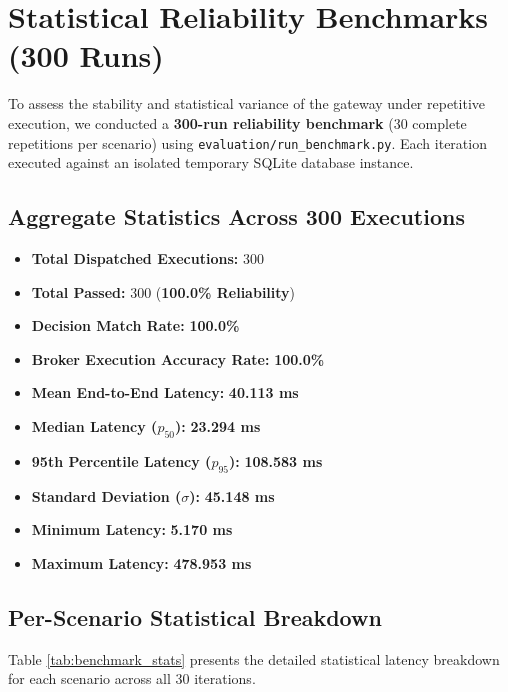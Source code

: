 \section{Statistical Reliability Benchmarks (300 Runs)}
To assess the stability and statistical variance of the gateway under repetitive execution, we conducted a \textbf{300-run reliability benchmark} (30 complete repetitions per scenario) using \texttt{evaluation/run\_benchmark.py}. Each iteration executed against an isolated temporary SQLite database instance.

\subsection{Aggregate Statistics Across 300 Executions}
\begin{itemize}
    \item \textbf{Total Dispatched Executions:} 300
    \item \textbf{Total Passed:} 300 (\textbf{100.0\% Reliability})
    \item \textbf{Decision Match Rate:} \textbf{100.0\%}
    \item \textbf{Broker Execution Accuracy Rate:} \textbf{100.0\%}
    \item \textbf{Mean End-to-End Latency:} \textbf{40.113 ms}
    \item \textbf{Median Latency ($p_{50}$):} \textbf{23.294 ms}
    \item \textbf{95th Percentile Latency ($p_{95}$):} \textbf{108.583 ms}
    \item \textbf{Standard Deviation ($\sigma$):} \textbf{45.148 ms}
    \item \textbf{Minimum Latency:} \textbf{5.170 ms}
    \item \textbf{Maximum Latency:} \textbf{478.953 ms}
\end{itemize}

\subsection{Per-Scenario Statistical Breakdown}
Table \ref{tab:benchmark_stats} presents the detailed statistical latency breakdown for each scenario across all 30 iterations.

